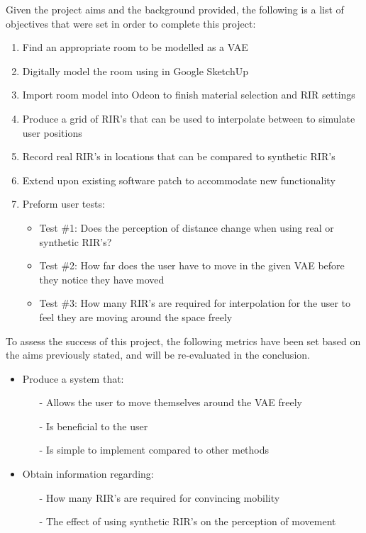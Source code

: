\documentclass[../../main.tex]{subfiles}
\begin{document}
		Given the project aims and the background provided, the following is a list of objectives that were set in order to complete this project:

		\begin{enumerate}
			\item Find an appropriate room to be modelled as a \ac{VAE} 
			\item Digitally model the room using in Google SketchUp
			\item Import room model into Odeon to finish material selection and \ac{RIR} settings
			\item Produce a grid of \ac{RIR}'s that can be used to interpolate between to simulate user positions
			\item Record real \ac{RIR}'s in locations that can be compared to synthetic \ac{RIR}'s
			\item Extend upon existing software patch to accommodate new functionality
			\item Preform user tests:
				\begin{itemize}
					\item Test \#1: Does the perception of distance change when using real or synthetic \ac{RIR}'s?
					\item Test \#2: How far does the user have to move in the given \ac{VAE} before they notice they have moved 
					\item Test \#3: How many \ac{RIR}'s are required for interpolation for the user to feel they are moving around the space freely
				\end{itemize}
			\end{enumerate}



	To assess the success of this project, the following metrics have been set based on the aims previously stated, and will be re-evaluated in the conclusion.

	\begin{itemize}
		\item Produce a system that:
	\begin{itemize}
		\item[-] Allows the user to move themselves around the \ac{VAE} freely
		\item[-] Is beneficial to the user
		\item[-] Is simple to implement compared to other methods
	\end{itemize}

		\item Obtain information regarding:
		\begin{itemize}
			\item[-] How many \ac{RIR}'s are required for convincing mobility
			\item[-] The effect of using synthetic \ac{RIR}'s on the perception of movement
		\end{itemize}
	\end{itemize}
\end{document}

